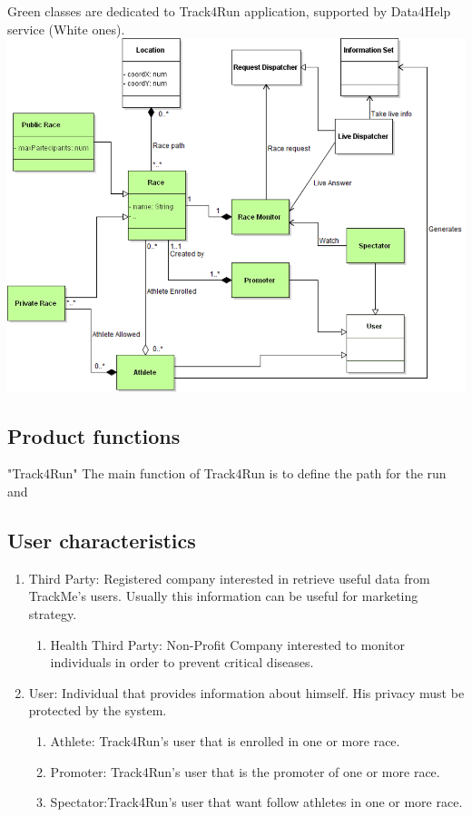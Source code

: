 \begin{center}
{\color{LimeGreen} Green classes} are dedicated to {\color{LimeGreen} Track4Run} application, supported by Data4Help service (White ones).
\includegraphics[scale=0.5]{Images/Class_Track4Run.png}
\end{center}


\subsection{Product functions}
"Track4Run"
The main function of Track4Run is to define the path for the run and

\subsection{User characteristics}
\begin{enumerate}
\item Third Party: Registered company interested in retrieve useful data from TrackMe's users. Usually this information can be useful for marketing strategy.
	\begin{enumerate}
		\item Health Third Party: Non-Profit Company interested to monitor 		individuals in order to prevent critical diseases. 
	\end{enumerate}
\item User: Individual that provides information about himself. His privacy must be protected by the system.
	\begin{enumerate}
		\item Athlete: Track4Run's user that is enrolled in one or more race.
		\item Promoter: Track4Run's user that is the promoter of one or more race.
		\item Spectator:Track4Run's user that want follow athletes in one or more race.
	\end{enumerate}
\end{enumerate}

